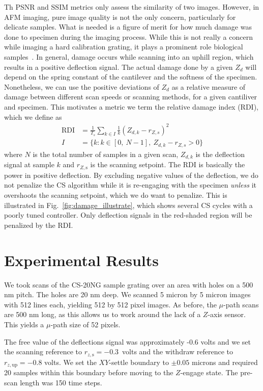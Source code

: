 \documentclass[twocolumn,oneside]{IEEEtran/IEEEtran}
\newcommand{\rzup}{\ensuremath{r_{z,\textrm{up}}}\xspace}
\newcommand{\rzs}{\ensuremath{r_{z,\textrm{s}}}\xspace}
\begin{document}
Th PSNR and SSIM metrics only assess the similarity of two images.
However, in AFM imaging, pure image quality is not the
only concern, particularly for delicate samples. What is needed is a figure of
merit for how much damage was done to specimen during the imaging process. While
this is not really a concern while imaging a hard calibration grating, it plays
a prominent role biological samples~\cite{ando_highspeed_2008}. In general,
damage occurs while scanning into an uphill region, which results in a positive
deflection signal. The actual damage done by a given $Z_d$ will depend on the
spring constant of the cantilever and the softness of the specimen. Nonetheless,
we can use the positive deviations of $Z_d$ as a relative measure of damage
between different scan speeds or scanning methods, for a given cantiliver and
specimen. This motivates a metric we term the relative damage index (RDI), which
we define as
\begin{align}
  \text{RDI} &= \frac{1}{T_s}\sum_{k\in I} \frac{1}{k} \left(Z_{d,k} - r_{Z,s}\right)^2 \label{eqn:RDI}\\
  I &= \{k: k\in[0,~N-1],~ Z_{d,k}-r_{Z,s} > 0 \} \nonumber
\end{align}
where $N$ is the total number of samples in a given scan, $Z_{d,k}$ is the
deflection signal at sample $k$ and $r_{Z,\textrm{s}}$ is the scanning setpoint.
The RDI is basically the power in positive deflection. By excluding negative
values of the deflection, we do not penalize the CS algorithm while it is
re-engaging with the specimen \emph{unless} it overshoots the scanning setpoint,
which we do want to penalize. This is illustrated in
Fig.~\ref{fig:damage_illustrate}, which shows several CS cycles with a poorly
tuned controller. Only deflection signals in the red-shaded region will be
penalized by the RDI.

\section{Experimental Results}\label{sec:results}
We took scans of the CS-20NG sample grating over an area with holes on a 500 nm
pitch. The holes are 20 nm deep.
We scanned 5 micron by 5 micron images with 512
lines each, yielding 512 by 512 pixel images. As before, the $\mu$-path scans
are 500 nm long, as this allows us to work around the lack of a $Z$-axis sensor.
This yields a $\mu$-path size of 52 pixels.

The free value of the deflections signal was approximately -0.6 volts and we set
the scanning reference to ${\rzs=-0.3}$~volts and the withdraw reference to
${\rzup=-0.8}$ volts. We set the $XY$-settle boundary to $\pm 0.05$
microns and required 20 samples within this boundary before moving to the
$Z$-engage state. The pre-scan length was 150 time steps.
\end{document}

